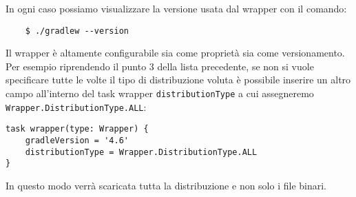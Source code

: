 In ogni caso possiamo visualizzare la versione usata dal wrapper con il comando:
\begin{verbatim}
    $ ./gradlew --version \end{verbatim}
Il wrapper è altamente configurabile sia come proprietà sia come versionamento. Per esempio riprendendo il punto 3 della lista precedente, se non si vuole specificare tutte le volte il tipo di distribuzione voluta è possibile inserire un altro campo all’interno del task wrapper \texttt{distributionType} a cui assegneremo \texttt{Wrapper.DistributionType.ALL}:
\begin{lstlisting}[frame=single]
task wrapper(type: Wrapper) {
    gradleVersion = '4.6'
    distributionType = Wrapper.DistributionType.ALL
}
\end{lstlisting}
In questo modo verrà scaricata tutta la distribuzione e non solo i file binari.